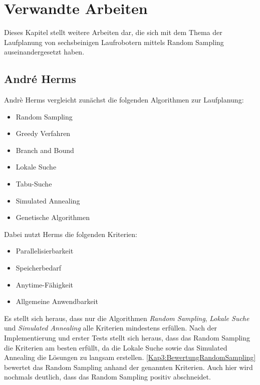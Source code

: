 \chapter{Verwandte Arbeiten}
\label{kap3}

Dieses Kapitel stellt weitere Arbeiten dar, die sich mit dem Thema der Laufplanung von sechsbeinigen Laufrobotern mittels Random Sampling auseinandergesetzt haben.

\section{André Herms}

Andrè Herms \autocite{herms2004} vergleicht zunächst die folgenden Algorithmen zur Laufplanung:
\begin{itemize}
  \item Random Sampling
  \item Greedy Verfahren
  \item Branch and Bound
  \item Lokale Suche
  \item Tabu-Suche
  \item Simulated Annealing
  \item Genetische Algorithmen
\end{itemize}

Dabei nutzt Herms die folgenden Kriterien:
\begin{itemize}
  \item Parallelisierbarkeit
  \item Speicherbedarf
  \item Anytime-Fähigkeit
  \item Allgemeine Anwendbarkeit
\end{itemize}

Es stellt sich heraus, dass nur die Algorithmen \emph{Random Sampling}, \emph{Lokale Suche} und \emph{Simulated Annealing} alle Kriterien mindestens erfüllen. Nach der Implementierung und erster Tests stellt sich heraus, dass das Random Sampling die Kriterien am besten erfüllt, da die Lokale Suche sowie das Simulated Annealing die Lösungen zu langsam erstellen. \autoref{Kap3:BewertungRandomSampling} bewertet das Random Sampling anhand der genannten Kriterien. Auch hier wird nochmals deutlich, dass das Random Sampling positiv abschneidet.

